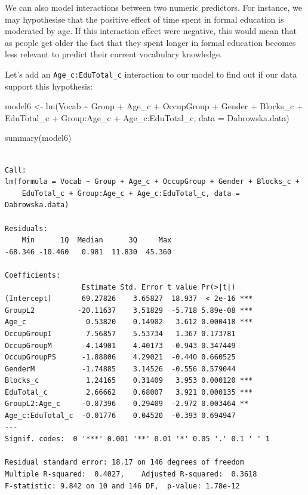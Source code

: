 \documentclass[
  letterpaper,
  DIV=11,
  numbers=noendperiod]{scrreprt}
\newenvironment{Shaded}{\begin{snugshade}}{\end{snugshade}}
\newcommand{\AttributeTok}[1]{\textcolor[rgb]{0.40,0.45,0.13}{#1}}
\newcommand{\FunctionTok}[1]{\textcolor[rgb]{0.28,0.35,0.67}{#1}}
\newcommand{\NormalTok}[1]{\textcolor[rgb]{0.00,0.23,0.31}{#1}}
\newcommand{\OtherTok}[1]{\textcolor[rgb]{0.00,0.23,0.31}{#1}}
\newcommand{\SpecialCharTok}[1]{\textcolor[rgb]{0.37,0.37,0.37}{#1}}
\begin{document}
We can also model interactions between two numeric predictors. For
instance, we may hypothesise that the positive effect of time spent in
formal education is moderated by age. If this interaction effect were
negative, this would mean that as people get older the fact that they
spent longer in formal education becomes less relevant to predict their
current vocabulary knowledge.

Let's add an \texttt{Age\_c:EduTotal\_c} interaction to our model to
find out if our data support this hypothesis:

\begin{Shaded}
\begin{Highlighting}[]
\NormalTok{model6 }\OtherTok{\textless{}{-}} \FunctionTok{lm}\NormalTok{(Vocab }\SpecialCharTok{\textasciitilde{}}\NormalTok{ Group }\SpecialCharTok{+}\NormalTok{ Age\_c }\SpecialCharTok{+}\NormalTok{ OccupGroup }\SpecialCharTok{+}\NormalTok{ Gender }\SpecialCharTok{+}\NormalTok{ Blocks\_c }\SpecialCharTok{+}\NormalTok{ EduTotal\_c }\SpecialCharTok{+}\NormalTok{ Group}\SpecialCharTok{:}\NormalTok{Age\_c }\SpecialCharTok{+}\NormalTok{ Age\_c}\SpecialCharTok{:}\NormalTok{EduTotal\_c,}
             \AttributeTok{data =}\NormalTok{ Dabrowska.data)}

\FunctionTok{summary}\NormalTok{(model6)}
\end{Highlighting}
\end{Shaded}

\begin{verbatim}

Call:
lm(formula = Vocab ~ Group + Age_c + OccupGroup + Gender + Blocks_c + 
    EduTotal_c + Group:Age_c + Age_c:EduTotal_c, data = Dabrowska.data)

Residuals:
    Min      1Q  Median      3Q     Max 
-68.346 -10.460   0.981  11.830  45.360 

Coefficients:
                  Estimate Std. Error t value Pr(>|t|)    
(Intercept)       69.27826    3.65827  18.937  < 2e-16 ***
GroupL2          -20.11637    3.51829  -5.718 5.89e-08 ***
Age_c              0.53820    0.14902   3.612 0.000418 ***
OccupGroupI        7.56857    5.53734   1.367 0.173781    
OccupGroupM       -4.14901    4.40173  -0.943 0.347449    
OccupGroupPS      -1.88806    4.29021  -0.440 0.660525    
GenderM           -1.74885    3.14526  -0.556 0.579044    
Blocks_c           1.24165    0.31409   3.953 0.000120 ***
EduTotal_c         2.66662    0.68007   3.921 0.000135 ***
GroupL2:Age_c     -0.87396    0.29409  -2.972 0.003464 ** 
Age_c:EduTotal_c  -0.01776    0.04520  -0.393 0.694947    
---
Signif. codes:  0 '***' 0.001 '**' 0.01 '*' 0.05 '.' 0.1 ' ' 1

Residual standard error: 18.17 on 146 degrees of freedom
Multiple R-squared:  0.4027,    Adjusted R-squared:  0.3618 
F-statistic: 9.842 on 10 and 146 DF,  p-value: 1.78e-12
\end{verbatim}
\end{document}
